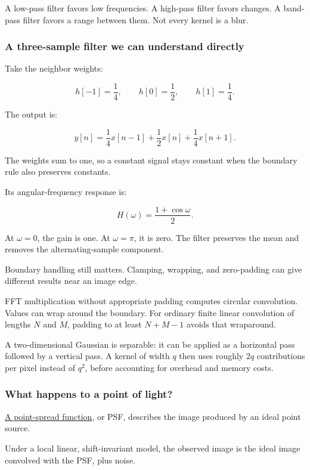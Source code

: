 A low-pass filter favors low frequencies. A high-pass filter favors changes. A band-pass filter favors a range between them. Not every kernel is a blur.

\subsubsection{A three-sample filter we can understand directly}\label{04-visual-computing-ii-ch043-a-three-sample-filter-we-can-understand-directly}

Take the neighbor weights:

\[
h[-1]=\frac14,\qquad h[0]=\frac12,\qquad h[1]=\frac14.
\]

The output is:

\[
y[n]=\frac14x[n-1]+\frac12x[n]+\frac14x[n+1].
\]

The weights sum to one, so a constant signal stays constant when the boundary rule also preserves constants.

Its angular-frequency response is:

\[
H(\omega)=\frac{1+\cos\omega}{2}.
\]

At \(\omega=0\), the gain is one. At \(\omega=\pi\), it is zero. The filter preserves the mean and removes the alternating-sample component.

Boundary handling still matters. Clamping, wrapping, and zero-padding can give different results near an image edge.

FFT multiplication without appropriate padding computes circular convolution. Values can wrap around the boundary. For ordinary finite linear convolution of lengths \(N\) and \(M\), padding to at least \(N+M-1\) avoids that wraparound.

A two-dimensional Gaussian is separable: it can be applied as a horizontal pass followed by a vertical pass. A kernel of width \(q\) then uses roughly \(2q\) contributions per pixel instead of \(q^2\), before accounting for overhead and memory costs.

\subsubsection{What happens to a point of light?}\label{04-visual-computing-ii-ch043-what-happens-to-a-point-of-light}

\hyperref[appendix-8b76b0efd27f]{A point-spread function}, or PSF, describes the image produced by an ideal point source.

Under a local linear, shift-invariant model, the observed image is the ideal image convolved with the PSF, plus noise.


